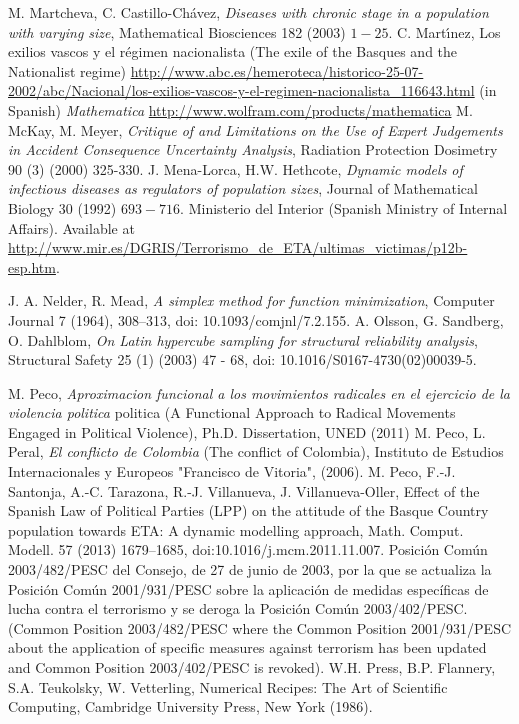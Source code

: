 \documentclass[12pt,a4paper]{report}
\begin{document}
\begin{thebibliography}{99}
 M. Martcheva, C. Castillo-Ch\'{a}vez, \textit{Diseases with chronic stage in a population with varying size}, Mathematical Biosciences 182 (2003) $1-25$.
 C. Mart\'{\i}nez, Los exilios vascos y el r\'egimen nacionalista (The exile of the Basques and the Nationalist regime) \url{http://www.abc.es/hemeroteca/historico-25-07-2002/abc/Nacional/los-exilios-vascos-y-el-regimen-nacionalista_116643.html} (in Spanish)
 \textit{Mathematica} \url{http://www.wolfram.com/products/mathematica}
 M. McKay, M. Meyer, \textit{Critique of and Limitations on the Use of Expert Judgements in Accident Consequence Uncertainty Analysis}, Radiation Protection Dosimetry 90 (3) (2000) 325-330.
 J. Mena-Lorca, H.W. Hethcote, \textit{Dynamic models of infectious diseases as regulators of population sizes}, Journal of Mathematical Biology 30 (1992) $693-716 $.
 Ministerio del Interior (Spanish Ministry of Internal Affairs). Available at \url{http://www.mir.es/DGRIS/Terrorismo_de_ETA/ultimas_victimas/p12b-esp.htm}. 

 J. A. Nelder, R. Mead, \textit{A simplex method for function minimization}, Computer Journal 7 (1964), 308--313, doi: 10.1093/comjnl/7.2.155.
  A. Olsson, G. Sandberg, O. Dahlblom, \textit{On Latin hypercube sampling for structural reliability analysis}, Structural Safety 25 (1) (2003) 47 - 68, doi: 10.1016/S0167-4730(02)00039-5.

 M. Peco, \textit{Aproximacion funcional a los movimientos radicales en el ejercicio de la violencia politica} politica (A Functional Approach to Radical Movements Engaged in Political Violence), Ph.D. Dissertation, UNED (2011)
 M. Peco, L. Peral, \textit{El conflicto de Colombia} (The conflict of Colombia), Instituto de Estudios Internacionales y Europeos "Francisco de Vitoria", (2006).
 M. Peco, F.-J. Santonja, A.-C. Tarazona, R.-J. Villanueva, J. Villanueva-Oller, Effect of the Spanish Law of Political Parties (LPP) on the attitude of the Basque Country population towards ETA: A dynamic modelling approach, Math.  Comput. Modell. 57 (2013) 1679--1685, doi:10.1016/j.mcm.2011.11.007.
 Posici\'{o}n Com\'{u}n 2003/482/PESC del Consejo, de 27 de junio de 2003, por la que se actualiza la Posici\'{o}n Com\'{u}n 2001/931/PESC sobre la aplicaci\'{o}n de medidas espec\'{i}ficas de lucha contra el terrorismo y se deroga la Posici\'{o}n Com\'{u}n 2003/402/PESC. (Common Position 2003/482/PESC where the Common Position 2001/931/PESC about the application of specific measures against terrorism has been updated and Common Position 2003/402/PESC is revoked).
 W.H. Press, B.P. Flannery, S.A. Teukolsky, W. Vetterling, Numerical Recipes: The Art of Scientific Computing, Cambridge University Press, New York (1986).


\end{thebibliography}
\end{document}
